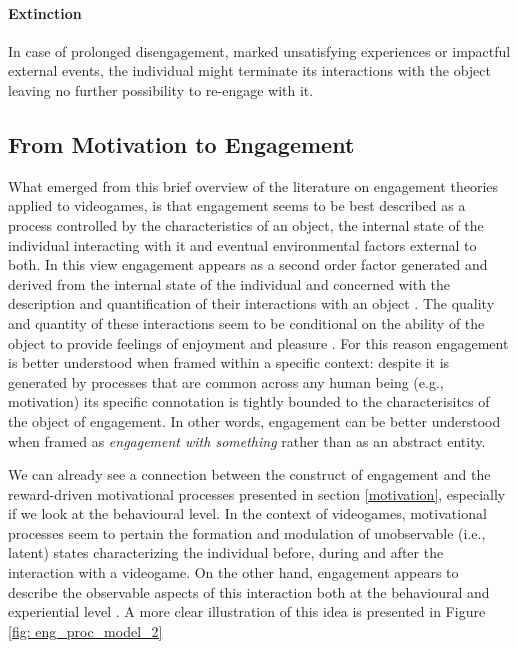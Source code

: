 \paragraph*{Extinction} In case of prolonged disengagement, marked unsatisfying experiences or impactful external events, the individual might terminate its interactions with the object leaving no further possibility to re-engage with it.

\subsection{From Motivation to Engagement}
\label{eng_reward_motivation}
What emerged from this brief overview of the literature on engagement theories applied to videogames, is that engagement seems to be best described as a process controlled by the characteristics of an object, the internal state of the individual interacting with it and eventual environmental factors external to both. In this view engagement appears as a second order factor generated and derived from the internal state of the individual and concerned with the description and quantification of their interactions with an object  \cite{lucas2004sex,o2008user,jennett2008measuring,boyle2012engagement,connolly2012systematic,csikszentmihalyi2014toward}. The quality and quantity of these interactions seem to be conditional on the ability of the object to provide feelings of enjoyment and pleasure \cite{lucas2004sex,o2008user,jennett2008measuring,boyle2012engagement,connolly2012systematic,csikszentmihalyi2014toward}. For this reason engagement is better understood when framed within a specific context: despite it is generated by processes that are common across any human being (e.g., motivation) its specific connotation is tightly bounded to the characterisitcs of the object of engagement. In other words, engagement can be better understood when framed as \textit{engagement with something} rather than as an abstract entity. 

We can already see a connection between the construct of engagement and the reward-driven motivational processes presented in section \ref{motivation}, especially if we look at the behavioural level. In the context of videogames, motivational processes seem to pertain the formation and modulation of unobservable (i.e., latent) states characterizing the individual before, during and after the interaction with a videogame. On the other hand, engagement appears to describe the observable aspects of this interaction both at the behavioural and experiential level \cite{lucas2004sex,o2008user,jennett2008measuring,boyle2012engagement,connolly2012systematic,csikszentmihalyi2014toward}. A more clear illustration of this idea is presented in Figure \ref{fig: eng_proc_model_2} 

